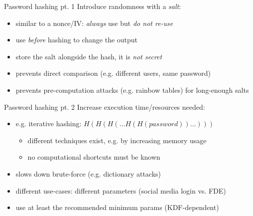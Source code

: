\begin{frame}{Password hashing pt. 1}
  \pause
  Introduce randomness with a \emph{salt}:
  \begin{itemize}[<+(1)->]
    \item similar to a nonce/IV: \emph{always} use but \emph{do not re-use}
    \item use \emph{before} hashing to change the output
    \item store the salt alongside the hash, it is \emph{not secret}
    \item prevents direct comparison (e.g. different users, same password)
    \item prevents pre-computation attacks (e.g. rainbow tables) for long-enough salts
  \end{itemize}
\end{frame}

\begin{frame}{Password hashing pt. 2}
  \pause
  Increase execution time/resources needed:
  \begin{itemize}[<+(1)->]
    \item e.g. iterative hashing: $H(H(H(\dots H(H(\mathit{password}))\dots)))$
    \begin{itemize}
      \item different techniques exist, e.g. by increasing memory usage
      \item no computational shortcuts must be known
    \end{itemize}
    \item slows down brute-force (e.g. dictionary attacks)
    \item different use-cases: different parameters (social media login vs. FDE)
    \item use at least the recommended minimum params (KDF-dependent)
  \end{itemize}
\end{frame}


